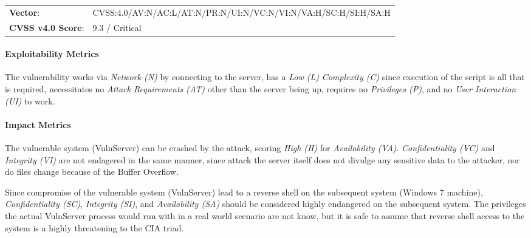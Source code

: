 \documentclass[../report.tex]{subfiles}
\begin{document}

\begin{tabular}{l l}
\textbf{Vector}: & CVSS:4.0/AV:N/AC:L/AT:N/PR:N/UI:N/VC:N/VI:N/VA:H/SC:H/SI:H/SA:H\\
\textbf{CVSS v4.0 Score}: & 9.3 / Critical\\
\end{tabular}

\paragraph*{Exploitability Metrics}
The vulnerability works via \textit{Network (N)} by connecting to the server, has a \textit{Low (L)} \textit{Complexity (C)} since execution of the script is all that is required, necessitates no \textit{Attack Requirements (AT)} other than the server being up, requires no \textit{Privileges (P)}, and no \textit{User Interaction (UI)} to work.

\paragraph*{Impact Metrics}
The vulnerable system (VulnServer) can be crashed by the attack, scoring \textit{High (H)} for \textit{Availability (VA)}. \textit{Confidentiality (VC)} and \textit{Integrity (VI)} are not endagered in the same manner, since attack the server itself does not divulge any sensitive data to the attacker, nor do  files change because of the Buffer Overflow.

Since compromise of the vulnerable system (VulnServer) lead to a reverse shell on the subsequent system (Windows 7 machine), \textit{Confidentiality (SC)}, \textit{Integrity (SI)}, and \textit{Availability (SA)} should be considered highly endangered on the subsequent system. The privileges the actual VulnServer process would run with in a real world scenario are not know, but it is safe to assume that reverse shell access to the system is a highly threatening to the CIA triad.

\newpage
\end{document}
